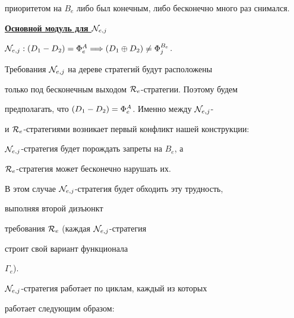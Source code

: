 приоритетом на $B_e$ либо был конечным, либо бесконечно много раз снимался.





\underline{\bf Основной модуль для ${\cal N}_{e,j}$}





\noindent $\req{N}{{e,j}}:\draz=\Phi_e^A\Longrightarrow \dsum\ne\Phi_j^{B_e}$.





\noindent Требования ${\cal N}_{e,j}$ на дереве стратегий будут расположены


только под бесконечным выходом ${\cal R}_e$-стратегии. Поэтому будем


предполагать, что $\draz=\Phi_e^A$. Именно между ${\cal N}_{e,j}$-


и ${\cal R}_e$-стратегиями возникает первый конфликт нашей конструкции:


${\cal N}_{e,j}$-стратегия будет порождать запреты на $B_e$, а


${\cal R}_e$-стратегия может бесконечно нарушать их.


В этом случае ${\cal N}_{e,j}$-стратегия будет обходить эту трудность,


выполняя второй дизъюнкт


требования ${\cal R}_e$ (каждая ${\cal N}_{e,j}$-стратегия


строит свой вариант функционала


$\Gamma_e$).












${\cal N}_{e,j}$-стратегия работает по циклам, каждый из которых


работает следующим образом:



